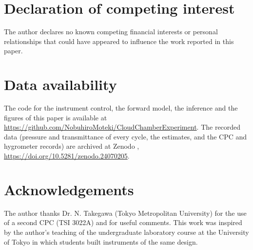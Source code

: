 \documentclass[preprint,review,12pt,authoryear]{elsarticle}
\begin{document}
\section*{Declaration of competing interest}
The author declares no known competing financial interests or personal relationships that could have
appeared to influence the work reported in this paper.

\section*{Data availability}
{\sloppy The code for the instrument control, the forward model, the inference and the figures of this paper
is available at \url{https://github.com/NobuhiroMoteki/CloudChamberExperiment}. The recorded data
(pressure and transmittance of every cycle, the estimates, and the CPC and hygrometer records) are
archived at Zenodo \citep{moteki2026data}, \url{https://doi.org/10.5281/zenodo.24070205}.\par}

\section*{Acknowledgements}
The author thanks Dr. N. Takegawa (Tokyo Metropolitan University) for the use of a second CPC
(TSI 3022A) and for useful comments.
This work was inspired by the author's teaching of the undergraduate laboratory course at the
University of Tokyo in which students built instruments of the same design.



\end{document}
